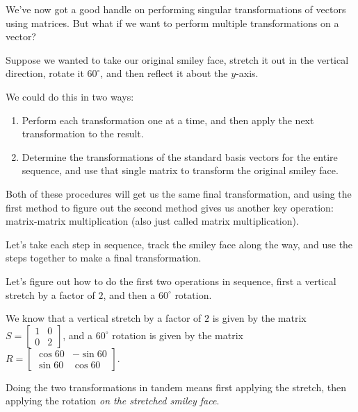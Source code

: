 \documentclass{ximera}
\begin{document}
\begin{exploration}

    We've now got a good handle on performing singular transformations of vectors using matrices. But what if we want to perform multiple transformations on a vector?

    Suppose we wanted to take our original smiley face, stretch it out in the vertical direction, rotate it $60^\circ$, and then reflect it about the $y$-axis. 

    We could do this in two ways:
    \begin{enumerate}

        \item Perform each transformation one at a time, and then apply the next transformation to the result.
        
        \item Determine the transformations of the standard basis vectors for the entire sequence, and use that single matrix to transform the original smiley face.

    \end{enumerate}

    Both of these procedures will get us the same final transformation, and using the first method to figure out the second method gives us another key operation: matrix-matrix multiplication (also just called matrix multiplication).

    Let's take each step in sequence, track the smiley face along the way, and use the steps together to make a final transformation. 

    \begin{example}

        Let's figure out how to do the first two operations in sequence, first a vertical stretch by a factor of $2$, and then a $60^\circ$ rotation.

        We know that a vertical stretch by a factor of $2$ is given by the matrix $S=\begin{bmatrix} 1 & 0 \\ 0 & 2 \end{bmatrix}$, and a $60^\circ$ rotation is given by the matrix $R=\begin{bmatrix} \cos 60 & -\sin 60 \\ \sin 60 & \cos 60 \end{bmatrix}$.

        Doing the two transformations in tandem means first applying the stretch, then applying the rotation \emph{on the stretched smiley face}.


\end{example}
\end{exploration}
\end{document}
